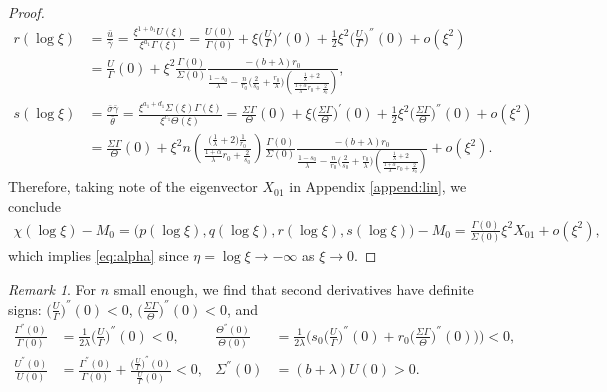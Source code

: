 \documentclass[11pt]{article}
\def\bg{{\bar{\gamma}}}
\def\bth{{\bar{\theta}}}
\def\bs{{\bar{\sigma}}}
\def\bu{{\bar{u}}}
\theoremstyle{remark}
\newtheorem{remark}{Remark}[section]
\begin{document}
\begin{proof}
\begin{align*}
 r(\log\xi) &= \frac{\bu}{ \bg } = \frac{ \xi^{1+b_1}U(\xi) }{ \xi^{a_1}\Gamma(\xi) } = \frac{ U(0) }{ \Gamma(0) }+ \xi \Big(\frac{U}{\Gamma}\Big)'(0) + \frac{1}{2}\xi^2\Big(\frac{U}{\Gamma}\Big)^{''}(0) + o(\xi^2)\\
  &=\frac{ U }{ \Gamma }(0) + \xi^2\frac{\Gamma(0)}{\Sigma(0)} \frac{-(b+\lambda)r_0}{\frac{1-s_0}{\lambda}-\frac{n}{r_0}\Big(\frac{2}{s_0} + \frac{r_0}{\lambda}\Big)\left(\frac{ \frac{1}{\lambda}+2}{ \frac{1+\alpha}{\lambda}r_0 + \frac{2}{s_0}}\right)} ,
  \\
 s(\log\xi) &= \frac{\bs\bg}{\bth} = \frac{ \xi^{a_1+d_1}\Sigma(\xi)\Gamma(\xi) }{\xi^{c_1} \Theta(\xi)} = \frac{ \Sigma\Gamma }{\Theta}(0) + \xi \Big(\frac{ \Sigma\Gamma }{\Theta}\Big)^{'}(0) + \frac{1}{2}\xi^2\Big(\frac{ \Sigma\Gamma }{\Theta}\Big)^{''}(0) + o(\xi^2)\\
 &=\frac{ \Sigma\Gamma }{\Theta}(0) + \xi^2 n \left(\frac{ \big(\frac{1}{\lambda}+2\big) \frac{1}{r_0} }{ \frac{1+\alpha}{\lambda}r_0 + \frac{2}{s_0}}\right)\frac{\Gamma(0)}{\Sigma(0)} \frac{-(b+\lambda)r_0}{\frac{1-s_0}{\lambda}-\frac{n}{r_0}\Big(\frac{2}{s_0} + \frac{r_0}{\lambda}\Big)\left(\frac{ \frac{1}{\lambda}+2}{ \frac{1+\alpha}{\lambda}r_0 + \frac{2}{s_0}}\right)}+ o(\xi^2).
\end{align*}
Therefore, taking note of the eigenvector $X_{01}$ in Appendix \ref{append:lin}, we conclude
\begin{align*}
\chi(\log\xi)-M_0  = \big(p(\log\xi),q(\log\xi),r(\log\xi),s(\log\xi)\big) -M_0 =  \frac{\Gamma(0)}{\Sigma(0)}\xi^2 X_{01} + o(\xi^2),
\end{align*}
which implies \eqref{eq:alpha} since $\eta=\log\xi \to -\infty$ as $\xi \to 0$.
\end{proof}
\begin{remark} \label{rem:signs}
For $n$ small enough, we find that second derivatives have definite signs: $\displaystyle \Big(\frac{U}{\Gamma}\Big)^{''}(0) <0$, $\displaystyle \Big(\frac{\Sigma\Gamma}{\Theta}\Big)^{''}(0) <0$, and
\begin{equation} \label{eq:second_der}
\begin{aligned}
\frac{\Gamma^{''}(0)}{\Gamma(0)} &= \frac{1}{2\lambda}\Big(\frac{U}{\Gamma}\Big)^{''}(0) < 0, &
\frac{\Theta^{''}(0)}{\Theta(0)} &= \frac{1}{2\lambda}\Big(s_0\Big(\frac{U}{\Gamma}\Big)^{''}(0) + r_0\Big(\frac{\Sigma\Gamma}{\Theta}\Big)^{''}(0)\Big)\Big)  < 0,\\
\frac{U^{''}(0)}{U(0)} &=\frac{\Gamma^{''}(0)}{\Gamma(0)} + \frac{ \big(\frac{U}{\Gamma}\big)^{''}(0)}{\frac{U}{\Gamma}(0)}< 0,&
\Sigma^{''}(0)&=(b+\lambda)U(0)>0.
\end{aligned}
\end{equation}
\end{remark}
\end{document}
